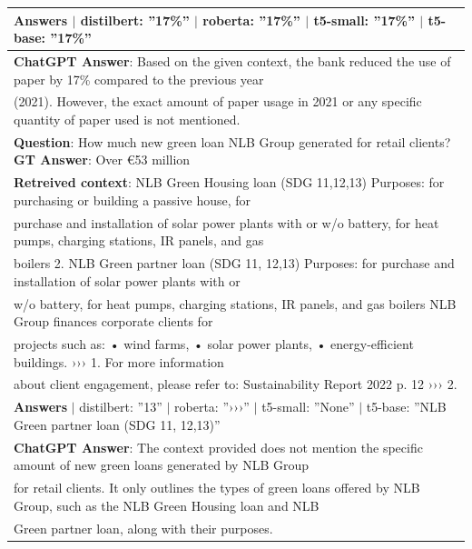 \documentclass[fleqn,moreauthors,10pt]{ds_report}
\begin{document}
\begin{table}[hbt]
{\begin{tabular}{l}
        \hline
		\textbf{Answers} $\mid$ distilbert: ''17\%'' $\mid$ roberta: ''17\%'' $\mid$ t5-small: ''17\%'' $\mid$ t5-base: ''17\%''\\
        \hline
        \textbf{ChatGPT Answer}: Based on the given context, the bank reduced the use of paper by 17\% compared to the previous year\\
        (2021). However, the exact amount of paper usage in 2021 or any specific quantity of paper used is not mentioned.\\
        \hline \hline
        \textbf{Question}: How much new green loan NLB Group generated for retail clients? \textbf{GT Answer}: Over €53 million\\
        \textbf{Retreived context}: NLB Green Housing loan (SDG 11,12,13) Purposes: for purchasing or building a passive house, for\\
        purchase and installation of solar power plants with or w/o battery, for heat pumps, charging stations, IR panels, and gas\\
        boilers 2. NLB Green partner loan (SDG 11, 12,13) Purposes: for purchase and installation of solar power plants with or\\
        w/o battery, for heat pumps, charging stations, IR panels, and gas boilers NLB Group finances corporate clients for\\
        projects such as: • wind farms, • solar power plants, • energy-efficient buildings. ››› 1. For more information\\
        about client engagement, please refer to: Sustainability Report 2022 p. 12 ››› 2. \\
        \hline
		\textbf{Answers} $\mid$ distilbert: ''13'' $\mid$ roberta: ''›››'' $\mid$ t5-small: ''None'' $\mid$ t5-base: ''NLB Green partner loan (SDG 11, 12,13)''\\
        \hline
        \textbf{ChatGPT Answer}: The context provided does not mention the specific amount of new green loans generated by NLB Group\\
        for retail clients. It only outlines the types of green loans offered by NLB Group, such as the NLB Green Housing loan and NLB\\
        Green partner loan, along with their purposes.\\
        \hline \hline
        
	\end{tabular}
    }
\end{table}
\end{document}

